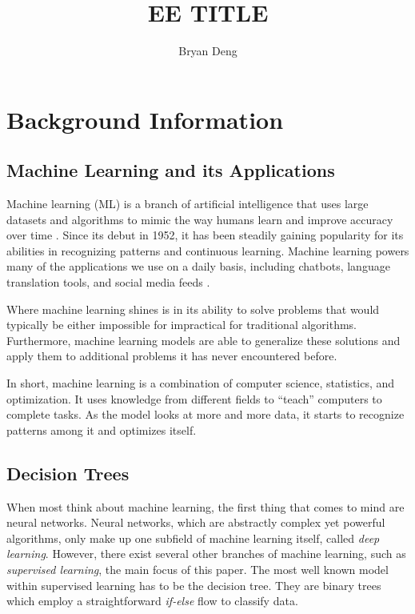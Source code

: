 \documentclass[12pt]{article}
\title{EE TITLE}
\author{Bryan Deng}
\date{}
\begin{document}
\maketitle
\newpage
\tableofcontents
\newpage

\section{Background Information}

\subsection{Machine Learning and its Applications}

Machine learning (ML) is a branch of artificial intelligence that uses large datasets and algorithms to mimic the way humans learn and improve accuracy over time \cite{what_is_ml_ibm}. Since its debut in 1952, it has been steadily gaining popularity for its abilities in recognizing patterns and continuous learning. Machine learning powers many of the applications we use on a daily basis, including chatbots, language translation tools, and social media feeds \cite{what_is_ml_mit}.

Where machine learning shines is in its ability to solve problems that would typically be either impossible for impractical for traditional algorithms. Furthermore, machine learning models are able to generalize these solutions and apply them to additional problems it has never encountered before.

In short, machine learning is a combination of computer science, statistics, and optimization. It uses knowledge from different fields to ``teach'' computers to complete tasks. As the model looks at more and more data, it starts to recognize patterns among it and optimizes itself.

\subsection{Decision Trees}

When most think about machine learning, the first thing that comes to mind are neural networks. Neural networks, which are abstractly complex yet powerful algorithms, only make up one subfield of machine learning itself, called \textit{deep learning}. However, there exist several other branches of machine learning, such as \textit{supervised learning}, the main focus of this paper. The most well known model within supervised learning has to be the decision tree. They are binary trees which employ a straightforward \textit{if-else} flow to classify data.
\end{document}
